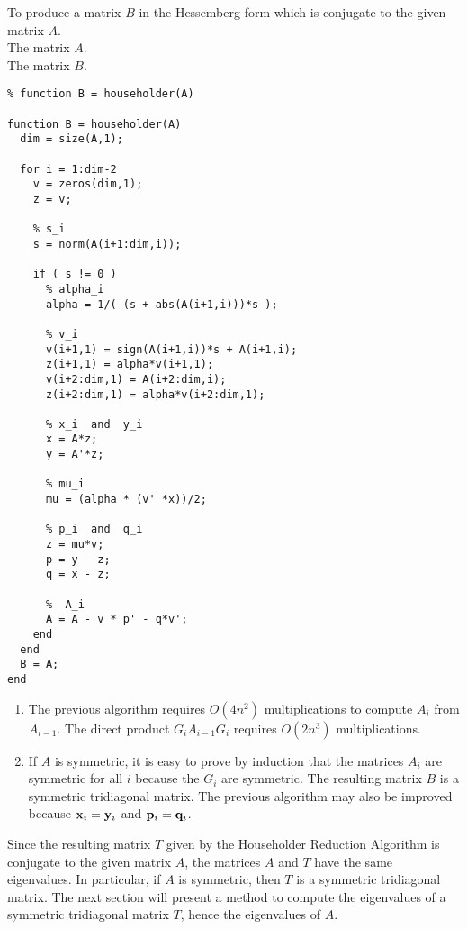 \begin{code}
To produce a matrix $B$ in the Hessemberg form which is conjugate to the
given matrix $A$.\\
 The matrix $A$.\\
 The matrix $B$.
\small
\begin{verbatim}
% function B = householder(A)

function B = householder(A)
  dim = size(A,1);

  for i = 1:dim-2
    v = zeros(dim,1);
    z = v;

    % s_i
    s = norm(A(i+1:dim,i));

    if ( s != 0 )
      % alpha_i
      alpha = 1/( (s + abs(A(i+1,i)))*s );

      % v_i
      v(i+1,1) = sign(A(i+1,i))*s + A(i+1,i);    
      z(i+1,1) = alpha*v(i+1,1);
      v(i+2:dim,1) = A(i+2:dim,i);
      z(i+2:dim,1) = alpha*v(i+2:dim,1);

      % x_i  and  y_i
      x = A*z;
      y = A'*z;

      % mu_i
      mu = (alpha * (v' *x))/2;

      % p_i  and  q_i
      z = mu*v;
      p = y - z;
      q = x - z;

      %  A_i
      A = A - v * p' - q*v';
    end
  end
  B = A;
end
\end{verbatim}
\end{code}

\begin{rmkList}
\begin{enumerate}
\item The previous algorithm requires $O(4n^2)$ multiplications to compute
$A_i$ from $A_{i-1}$.  The direct product $G_i A_{i-1} G_i$ requires
$O(2n^3)$ multiplications.
\item If $A$ is symmetric, it is easy to prove by induction that the matrices
$A_i$ are symmetric for all $i$ because the $G_i$ are symmetric.  The
resulting matrix $B$ is a symmetric tridiagonal matrix.  The previous
algorithm may also be improved because $\mathbf{x}_i = \mathbf{y}_i$ and
$\mathbf{p}_i = \mathbf{q}_i$.
\end{enumerate}
\end{rmkList}

Since the resulting matrix $T$ given by the Householder Reduction Algorithm
is conjugate to the given matrix $A$, the matrices $A$ and $T$ have the same
eigenvalues.  In particular, if $A$ is symmetric, then $T$ is a symmetric
tridiagonal matrix.  The next section will present a method to compute the
eigenvalues of a symmetric tridiagonal matrix $T$, hence the eigenvalues of
$A$.

